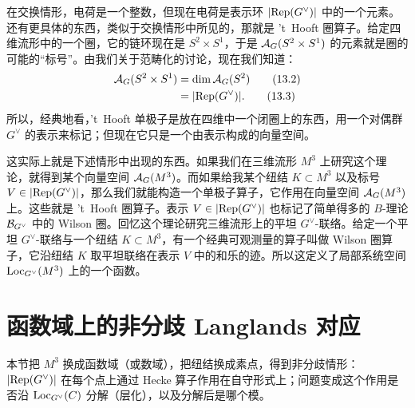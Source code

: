 在交换情形，电荷是一个整数，但现在电荷是表示环 $|\mathrm{Rep}(G^\vee)|$ 中的一个元素。还有更具体的东西，类似于交换情形中所见的，那就是 't~Hooft 圈算子。给定四维流形中的一个圈，它的链环现在是 $S^2\times S^1$，于是 $\mathcal{A}_G(S^2\times S^1)$ 的元素就是圈的可能的“标号”。由我们关于范畴化的讨论，现在我们知道：
\begin{align}
\mathcal{A}_G(S^2\times S^1)&=\dim\mathcal{A}_G(S^2) \tag{13.2}\\
&=|\mathrm{Rep}(G^\vee)|. \tag{13.3}
\end{align}
所以，经典地看，'t~Hooft 单极子是放在四维中一个闭圈上的东西，用一个对偶群 $G^\vee$ 的表示来标记；但现在它只是一个由表示构成的向量空间。

这实际上就是下述情形中出现的东西。如果我们在三维流形 $M^3$ 上研究这个理论，就得到某个向量空间 $\mathcal{A}_G(M^3)$。而如果给我某个纽结 $K\subset M^3$ 以及标号 $V\in|\mathrm{Rep}(G^\vee)|$，那么我们就能构造一个单极子算子，它作用在向量空间 $\mathcal{A}_G(M^3)$ 上。这些就是 't~Hooft 圈算子。表示 $V\in|\mathrm{Rep}(G^\vee)|$ 也标记了简单得多的 $B$-理论 $\mathcal{B}_{G^\vee}$ 中的 Wilson 圈。回忆这个理论研究三维流形上的平坦 $G^\vee$-联络。给定一个平坦 $G^\vee$-联络与一个纽结 $K\subset M^3$，有一个经典可观测量的算子叫做 Wilson 圈算子，它沿纽结 $K$ 取平坦联络在表示 $V$ 中的和乐的迹。所以这定义了局部系统空间 $\mathrm{Loc}_{G^\vee}(M^3)$ 上的一个函数。


\section{函数域上的非分歧 Langlands 对应}\label{sec:13-2}

\begin{sectionkey}
本节把 $M^3$ 换成函数域（或数域），把纽结换成素点，得到非分歧情形：$|\mathrm{Rep}(G^\vee)|$ 在每个点上通过 Hecke 算子作用在自守形式上；问题变成这个作用是否沿 $\mathrm{Loc}_{G^\vee}(C)$ 分解（层化），以及分解后是哪个模。
\end{sectionkey}

